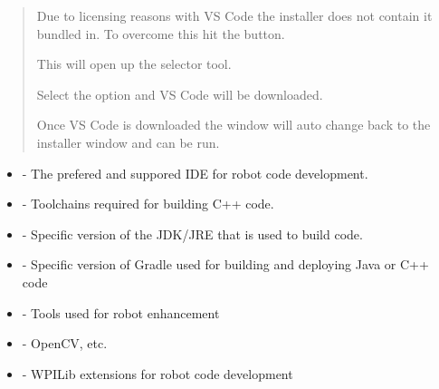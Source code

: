 \documentclass[letterpaper,10pt,english]{sphinxmanual}
\begin{document}
\begin{quote}

Due to licensing reasons with VS Code the installer does not contain it bundled in. To overcome this hit the  button.


This will open up the selector tool.


Select the  option and VS Code will be downloaded.


Once VS Code is downloaded the window will auto change back to the installer window and  can be run.

\end{quote}

\begin{itemize}
\item {} 
 - The prefered and suppored IDE for robot code development.

\item {} 
 - Toolchains required for building C++ code.

\item {} 
 - Specific version of the JDK/JRE that is used to build code.

\item {} 
 - Specific version of Gradle used for building and deploying Java or C++ code

\item {} 
 - Tools used for robot enhancement

\item {} 
 - OpenCV, etc.

\item {} 
 - WPILib extensions for robot code development

\end{itemize}
\end{document}
